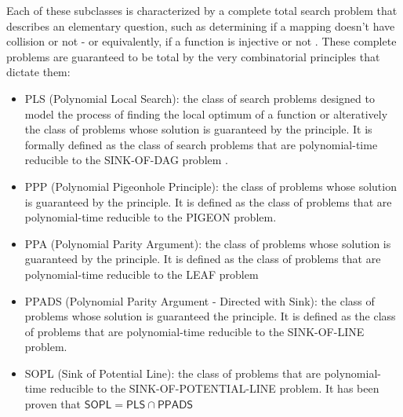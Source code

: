 Each of these subclasses is characterized by a complete total search problem that describes an elementary question, such as determining if a mapping doesn't have collision or not - or equivalently, if a function is injective or not \cite{proofs_circuits_communication,tfnp_characterization}. These complete problems are guaranteed to be total by the very combinatorial principles that dictate them:

\begin{itemize}
    \item \textsf{PLS} (Polynomial Local Search): the class of search problems designed to model the process of finding the local optimum of a function or alteratively the class of problems whose solution is guaranteed by the  principle. It is formally defined as the class of search problems that are polynomial-time reducible to the SINK-OF-DAG problem .
    
    \item \textsf{PPP} (Polynomial Pigeonhole Principle): the class of problems whose solution is guaranteed by the  principle. It is defined as the class of problems that are polynomial-time reducible to the PIGEON problem.
    
    \item \textsf{PPA} (Polynomial Parity Argument): the class of problems whose solution is guaranteed by the  principle. It is defined as the class of problems that are polynomial-time reducible to the LEAF problem
    
    \item \textsf{PPADS} (Polynomial Parity Argument - Directed with Sink): the class of problems whose solution is guaranteed the  principle. It is defined as the class of problems that are polynomial-time reducible to the SINK-OF-LINE problem.
    
    \item \textsf{SOPL} (Sink of Potential Line): the class of problems that are polynomial-time reducible to the SINK-OF-POTENTIAL-LINE problem. It has been proven that $\mathsf{SOPL} = \mathsf{PLS} \cap \mathsf{PPADS}$ \cite{Further_collapses_TFNP}
    

\end{itemize}
